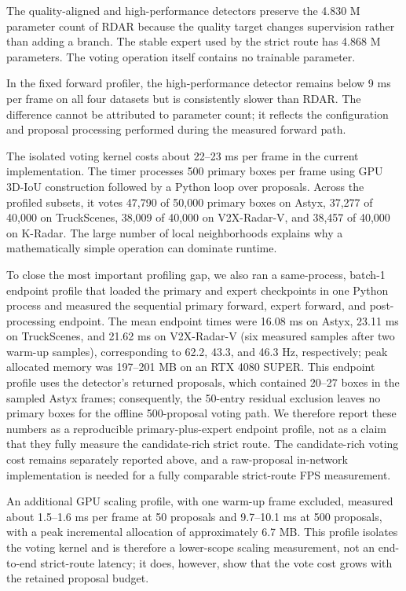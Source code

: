 \documentclass[preprint,12pt,times]{elsarticle}
\begin{document}
The quality-aligned and high-performance detectors preserve the 4.830 M
parameter count of RDAR because the quality target changes supervision rather
than adding a branch. The stable expert used by the strict route has 4.868 M
parameters. The voting operation itself contains no trainable parameter.

In the fixed forward profiler, the high-performance detector remains below
9 ms per frame on all four datasets but is consistently slower than RDAR. The
difference cannot be attributed to parameter count; it reflects the
configuration and proposal processing performed during the measured forward
path.

The isolated voting kernel costs about 22--23 ms per frame in the current
implementation. The timer processes 500 primary boxes per frame using GPU 3D-IoU construction
followed by a Python loop over proposals. Across the profiled subsets, it votes
47,790 of 50,000 primary boxes on Astyx, 37,277 of 40,000 on TruckScenes,
38,009 of 40,000 on V2X-Radar-V, and 38,457 of 40,000 on K-Radar. The large
number of local neighborhoods explains why a mathematically simple operation
can dominate runtime.

To close the most important profiling gap, we also ran a same-process,
batch-1 endpoint profile that loaded the primary and expert checkpoints in one
Python process and measured the sequential primary forward, expert forward,
and post-processing endpoint. The mean endpoint times were 16.08 ms on Astyx,
23.11 ms on TruckScenes, and 21.62 ms on V2X-Radar-V (six measured samples
after two warm-up samples), corresponding to 62.2, 43.3, and 46.3 Hz,
respectively; peak allocated memory was 197--201 MB on an RTX 4080 SUPER.
This endpoint profile uses the detector's returned proposals, which contained
20--27 boxes in the sampled Astyx frames; consequently, the 50-entry residual
exclusion leaves no primary boxes for the offline 500-proposal voting path.
We therefore report these numbers as a reproducible primary-plus-expert
endpoint profile, not as a claim that they fully measure the candidate-rich
strict route. The candidate-rich voting cost remains separately reported
above, and a raw-proposal in-network implementation is needed for a fully
comparable strict-route FPS measurement.

An additional GPU scaling profile, with one warm-up frame excluded, measured
about 1.5--1.6 ms per frame at 50 proposals and 9.7--10.1 ms at 500 proposals,
with a peak incremental allocation of approximately 6.7 MB. This profile
isolates the voting kernel and is therefore a lower-scope scaling measurement,
not an end-to-end strict-route latency; it does, however, show that the vote
cost grows with the retained proposal budget.
\end{document}
